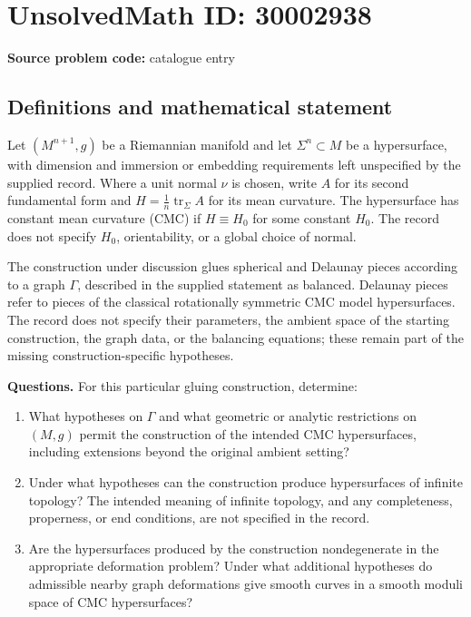 \documentclass[11pt]{article}
\begin{document}
\section*{UnsolvedMath ID: 30002938}
\textbf{Source problem code:} catalogue entry
\subsection{Definitions and mathematical statement}
Let \((M^{n+1},g)\) be a Riemannian manifold and let \(\Sigma^n\subset M\) be a hypersurface, with dimension and immersion or embedding requirements left unspecified by the supplied record. Where a unit normal \(\nu\) is chosen, write \(A\) for its second fundamental form and \(H=\frac1n\operatorname{tr}_{\Sigma}A\) for its mean curvature. The hypersurface has constant mean curvature (CMC) if \(H\equiv H_0\) for some constant \(H_0\). The record does not specify \(H_0\), orientability, or a global choice of normal.

The construction under discussion glues spherical and Delaunay pieces according to a graph \(\Gamma\), described in the supplied statement as balanced. Delaunay pieces refer to pieces of the classical rotationally symmetric CMC model hypersurfaces. The record does not specify their parameters, the ambient space of the starting construction, the graph data, or the balancing equations; these remain part of the missing construction-specific hypotheses.

\textbf{Questions.} For this particular gluing construction, determine:
\begin{enumerate}
\item What hypotheses on \(\Gamma\) and what geometric or analytic restrictions on \((M,g)\) permit the construction of the intended CMC hypersurfaces, including extensions beyond the original ambient setting?
\item Under what hypotheses can the construction produce hypersurfaces of infinite topology? The intended meaning of infinite topology, and any completeness, properness, or end conditions, are not specified in the record.
\item Are the hypersurfaces produced by the construction nondegenerate in the appropriate deformation problem? Under what additional hypotheses do admissible nearby graph deformations give smooth curves in a smooth moduli space of CMC hypersurfaces?
\end{enumerate}
\end{document}
